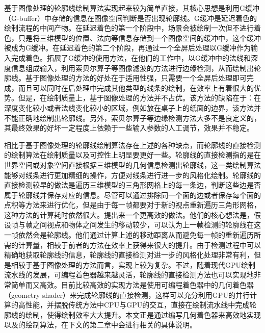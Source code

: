 基于图像处理的轮廓线绘制算法实现起来较为简单直接，其核心思想是利用G缓冲（G-buffer）中存储的信息在图像空间判断是否出现轮廓线。G缓冲是延迟着色\cite{duluk2004deferred}的绘制流程的中间产物。在延迟着色的第一个阶段中，场景会被绘制一次但不进行着色，只是将三维模型的位置、法向等信息存储到一个图像空间的缓冲中，这个缓冲被成为G缓冲。在延迟着色的第二个阶段，再通过一个全屏后处理以G缓冲作为输入完成着色。\citeauthor{decaudin1996cartoon}拓展了G缓冲的使用方法，在他们的工作\cite{decaudin1996cartoon}中，以G缓冲中的法线和深度信息组成输入，利用索贝尔算子\cite{gao2010improved}等图像滤波的方法进行边缘检测，从而绘制出轮廓线。基于图像处理的方法的好处在于适用性强，只需要一个全屏后处理即可完成，而且可以同时在后处理中完成其他类型的线条的绘制，在效率上有着很大的优势。但是，在绘制质量上，基于图像处理的方法并不占优。该方法的缺陷在于：在深度变化较小或者法线变化较小的区域，例如放在桌子上的纸面的边界，该方法并不能正确地绘制出轮廓线。另外，索贝尔算子等边缘检测方法大多不是良定义的，其最终效果的好坏一定程度上依赖于一些输入参数的人工调节，效果并不稳定。


相比于基于图像处理的轮廓线绘制算法存在上述的各种缺点，而轮廓线的直接检测的绘制算法在绘制质量以及可控性上明显要更好一些。轮廓线的直接检测指的是在世界空间或对象空间直接根据三维模型的几何信息检测出轮廓线，这一类绘制算法能够对线条进行更加精细的操作，方便对线条进行进一步的风格化绘制。轮廓线的直接检测较早的做法\cite{marshall2001cartoon}是遍历三维模型的三角形网格上的每一条边，判断这些边是否属于轮廓线并保存对应的信息。尽管可以通过排除同一个面的边或者保存每个面的点积等方法来进行优化，但是由于每一帧都要对于新的视点重新遍历三角形网格，这种方法的计算耗时依然很大。\citeauthor{decaudin1996cartoon}提出来一个更高效的做法\cite{decaudin1996cartoon}。他们的核心想法是，假设帧与帧之间视点和物体之间发生的移动较少，可以认为上一帧检测的轮廓线在这一帧依然会是轮廓线。他们通过计算上述的移动距离从而避免每一帧的重新遍历所需的计算量，相较于前者的方法在效率上获得来很大的提升。由于检测过程中可以精确地获取轮廓线的信息，轮廓线的直接检测对进一步的风格化处理非常有利，但是相较于基于图像处理的方法而言，实现上较为复杂。不过，随着现代GPU绘制流水线的发展，可编程着色器越来越灵活，轮廓线的直接检测方法也可以实现地非常简单而又高效。目前比较高效的实现方法是使用可编程着色器中的几何着色器（geometry shader）来完成轮廓线的直接检测，这样可以充分利用GPU的并行计算的高性能，并摆脱传统方法中CPU与GPU的交互，直接在绘制流水线中完成轮廓线的绘制，使得绘制效率大大提升。本文正是通过编写几何着色器来高效地实现\con{}以及\scon{}的绘制算法，在下文的第二章中会进行相关的具体说明。

